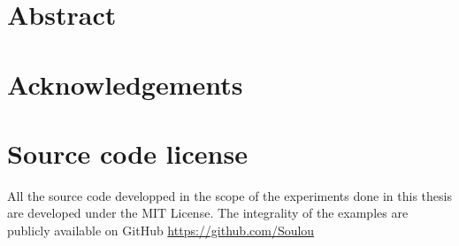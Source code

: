 \documentclass[a4paper, 12pt, twoside]{Thesis}  %
\begin{document}
\chapter{Abstract}

\clearpage
\chapter{Acknowledgements}

\clearpage
\chapter{Source code license}

All the source code developped in the scope of the experiments done in this
thesis are developed under the MIT License. The integrality of the examples
are publicly available on GitHub \url{https://github.com/Soulou}


\clearpage

\pagestyle{fancy}

\tableofcontents  %

\listoffigures  %

\listoftables  %

\clearpage  %
\end{document}
